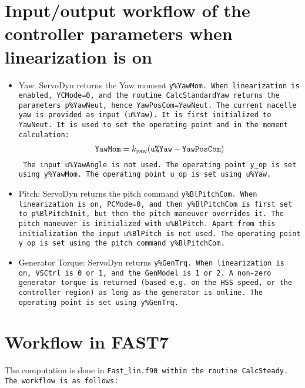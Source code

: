\documentclass[11pt]{article}
\begin{document}
\section{Input/output workflow of the controller parameters when linearization is on}
\begin{itemize}
    \item Yaw: ServoDyn returns the Yaw moment \tt{y\%YawMom}. 
        When linearization is enabled, \tt{YCMode=0}, and the routine \tt{CalcStandardYaw} returns the parameters \tt{p\%YawNeut}, hence \tt{YawPosCom}=\tt{YawNeut}. 
        The current nacelle yaw is provided as input (\tt{u\%Yaw}). It is first initialized to \tt{YawNeut}. It is used to set the operating point and in the moment calculation:
        \begin{align}
            \tt{YawMom} = k_\text{yaw} ( \tt{u\%Yaw} - \tt{YawPosCom} )
        \end{align}
        The input \tt{u\%YawAngle} is not used.
        The operating point \tt{y\_op} is set using \tt{y\%YawMom}.
        The operating point \tt{u\_op} is set using \tt{u\%Yaw}.
    \item Pitch: ServoDyn returns the pitch command \tt{y\%BlPitchCom}.
        When linearization is on, \tt{PCMode=0}, and then \tt{y\%BlPitchCom} is first set to \tt{p\%BlPitchInit}, but then the pitch maneuver overrides it. 
        The pitch maneuver is initialized with \tt{u\%BlPitch}.
        Apart from this initialization the input \tt{u\%BlPitch} is not used.
        The operating point \tt{y\_op} is set using the pitch command \tt{y\%BlPitchCom}.
    \item Generator Torque: ServoDyn returns \tt{y\%GenTrq}. 
        When linearization is on, \tt{VSCtrl} is 0 or 1, and the \tt{GenModel} is 1 or 2. 
        A non-zero generator torque is returned (based e.g. on the HSS speed, or the controller region) as long as the generator is online.
        The operating point is set using \tt{y\%GenTrq}.
\end{itemize}





\section{Workflow in FAST7}\label{old-workflow}
The computation is done in \tt{Fast\_lin.f90} within the routine \tt{CalcSteady}.
The workflow is as follows:
\end{document}
